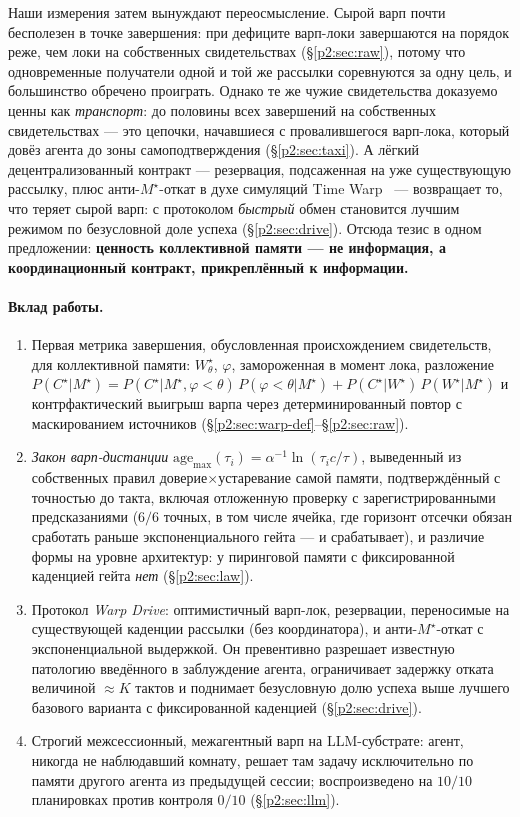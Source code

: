 \documentclass{article}
\newcommand{\wstar}{W^{\star}}
\newcommand{\mstar}{M^{\star}}
\newcommand{\cstar}{C^{\star}}
\begin{document}
Наши измерения затем вынуждают переосмысление. Сырой варп почти
бесполезен в точке завершения: при дефиците варп-локи завершаются на
порядок реже, чем локи на собственных свидетельствах
(\S\ref{p2:sec:raw}), потому что одновременные получатели одной и той же
рассылки соревнуются за одну цель, и большинство обречено проиграть.
Однако те же чужие свидетельства доказуемо ценны как
\emph{транспорт}: до половины всех завершений на собственных
свидетельствах --- это цепочки, начавшиеся с провалившегося
варп-лока, который довёз агента до зоны самоподтверждения
(\S\ref{p2:sec:taxi}). А лёгкий децентрализованный контракт ---
резервация, подсаженная на уже существующую рассылку, плюс
анти-$\mstar$-откат в духе симуляций Time
Warp~\cite{jefferson1985}
--- возвращает то, что теряет сырой варп: с протоколом \emph{быстрый}
обмен становится лучшим режимом по безусловной доле успеха
(\S\ref{p2:sec:drive}). Отсюда тезис в одном предложении:
\textbf{ценность коллективной памяти --- не информация, а
координационный контракт, прикреплённый к информации.}

\paragraph{Вклад работы.}
\begin{enumerate}[leftmargin=20pt,itemsep=2pt,topsep=2pt]
\item Первая метрика завершения, обусловленная происхождением
  свидетельств, для коллективной памяти: $\wstar_\theta$, $\varphi$,
  замороженная в момент лока, разложение
  $P(\cstar|\mstar)=P(\cstar|\mstar,\varphi{<}\theta)\,P(\varphi{<}\theta|\mstar)
  + P(\cstar|\wstar)\,P(\wstar|\mstar)$ и контрфактический выигрыш
  варпа через детерминированный повтор с маскированием источников
  (\S\ref{p2:sec:warp-def}--\S\ref{p2:sec:raw}).
\item \emph{Закон варп-дистанции}
  $\mathrm{age}_{\max}(\tau_i)=\alpha^{-1}\ln(\tau_i c/\tau)$,
  выведенный из собственных правил доверие$\times$устаревание самой
  памяти, подтверждённый с точностью до такта, включая отложенную
  проверку с зарегистрированными предсказаниями ($6/6$ точных, в том
  числе ячейка, где горизонт отсечки обязан сработать раньше
  экспоненциального гейта --- и срабатывает), и различие формы на
  уровне архитектур: у пиринговой памяти с фиксированной каденцией
  гейта \emph{нет} (\S\ref{p2:sec:law}).
\item Протокол \emph{Warp Drive}: оптимистичный варп-лок, резервации,
  переносимые на существующей каденции рассылки (без координатора), и
  анти-$\mstar$-откат с экспоненциальной выдержкой. Он превентивно
  разрешает известную патологию введённого в заблуждение агента,
  ограничивает задержку отката величиной ${\approx}K$ тактов и
  поднимает безусловную долю успеха выше лучшего базового варианта с
  фиксированной каденцией (\S\ref{p2:sec:drive}).
\item Строгий межсессионный, межагентный варп на LLM-субстрате:
  агент, никогда не наблюдавший комнату, решает там задачу
  исключительно по памяти другого агента из предыдущей сессии;
  воспроизведено на $10/10$ планировках против контроля $0/10$
  (\S\ref{p2:sec:llm}).
\end{enumerate}
\end{document}
